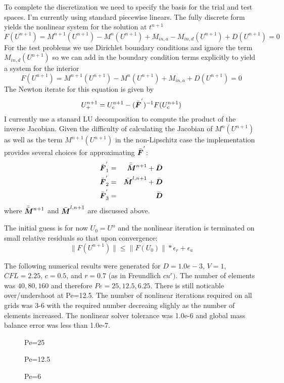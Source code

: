 \documentclass[10pt,dvips,twoside,reqno]{amsart}
\begin{document}
To complete the discretization we need to specify the basis for the
trial and test spaces. I'm currently using standard piecewise linears.
The fully discrete form yields the nonlinear system for the solution
at $t^{n+1}$
\begin{equation}
F(U^{n+1}) = M^{n+1}(U^{n+1}) - M^{n}(U^{n+1}) + M_{in,a} - M_{in,d}(U^{n+1}) + D(U^{n+1}) = 0
\end{equation}
For the test problems we use Dirichlet boundary conditions and ignore the term $M_{in,d}(U^{n+1})$ so we can add in the boundary condition terms explicitly to yield a system for the interior
\begin{equation}
F(U^{n+1}) = M^{n+1}(U^{n+1}) - M^{n}(U^{n+1}) + M_{in,a} + D(U^{n+1}) = 0
\end{equation}
The Newton iterate for this equation is given by
\begin{equation}
U^{n+1}_+ = U^{n+1}_c - (\bar{\mbox{{\boldmath ${F}$}}}^{'})^{-1} F(U^{n+1}_c)
\end{equation}
I currently use a stanard LU decomposition to compute the product of
the inverse Jacobian.  Given the difficulty of calculating the
Jacobian of $M^{n}(U^{n+1})$ as well as the term $M^{n+1}(U^{n+1})$ in
the non-Lipschitz case the implementation provides several choices for
approximating $\bar{\mbox{{\boldmath ${F}$}}}^{'}$:
\begin{eqnarray}
\bar{\mbox{{\boldmath ${F}$}}}^{'}_1 &=& \bar{\bar{\mbox{{\boldmath ${M}$}}}}^{n+1} + \bar{\mbox{{\boldmath ${D}$}}} \\
\bar{\mbox{{\boldmath ${F}$}}}^{'}_2 &=& \bar{\mbox{{\boldmath ${M}$}}}^{l,n+1} + \bar{\mbox{{\boldmath ${D}$}}} \\
\bar{\mbox{{\boldmath ${F}$}}}^{'}_3 &=& \bar{\mbox{{\boldmath ${D}$}}} 
\end{eqnarray}
where $\bar{\bar{\mbox{{\boldmath ${M}$}}}}^{n+1}$ and $\bar{\mbox{{\boldmath ${M}$}}}^{l,n+1}$ are discussed above. 

The initial guess is for now $U_0 = U^{n}$ and the nonlinear iteration
is terminated on small relative residuals so that upon convergence:
\begin{equation}
\| F(U^{n+1}) \| \leq \| F(U_0) \| * \epsilon_r + \epsilon_a 
\end{equation}

The following numerical results were generated for $D=1.0e-3$, $V=1$,
$CFL=2.25$, $c=0.5$, and $r=0.7$ (as in Freundlich $c u^r)$. The
number of elements was $40,80,160$ and therefore $Pe=25,12.5,6.25$.
There is still noticable over/undershoot at Pe=12.5. The number
of nonlinear iterations required on all grids was 3-6 with the
required number decreaing slighly as the number of elements increased.
The nonlinear solver tolerance was 1.0e-6 and global mass balance
error was less than 1.0e-7.
\begin{figure}
\caption{Pe=25}
\end{figure}
\begin{figure}
\caption{Pe=12.5}
\end{figure}
\begin{figure}
\caption{Pe=6}
\end{figure}
\end{document}
